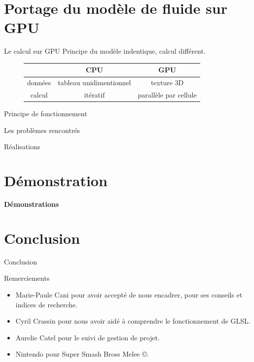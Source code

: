 \documentclass{beamer}
\begin{document}
\section{Portage du modèle de fluide sur GPU}
\begin{frame}{Le calcul sur GPU}
  Principe du modèle indentique, calcul différent.\\
  \begin{figure}[!h]
    \begin{tabular}{c|c|c}
       & CPU & GPU \\
      \hline
      données & tableau unidimentionnel & texture 3D \\
      calcul  & itératif                & parallèle par cellule \\
    \end{tabular}
  \end{figure}
\end{frame}

\begin{frame}{Principe de fonctionnement}
  
\end{frame}

\begin{frame}{Les problèmes rencontrés}
\end{frame}

\begin{frame}{Réalisations}
\end{frame}

\section{Démonstration}
\begin{frame}
  \begin{center}
    \textbf{Démonstrations}
  \end{center}
\end{frame}

\section{Conclusion}
\begin{frame}{Conclusion}
\end{frame}

\begin{frame}{Remerciements}
  \begin{itemize}
  \item{Marie-Paule Cani} pour avoir accepté de nous encadrer, pour
    ses conseils et indices de recherche.
  \item{Cyril Crassin} pour nous avoir aidé à comprendre le
    fonctionnement de GLSL.
  \item{Aurelie Catel} pour le suivi de gestion de projet.
  \item{Nintendo\texttrademark} pour Super Smash Bross Melee ©.
  \end{itemize}
\end{frame}
\end{document}
